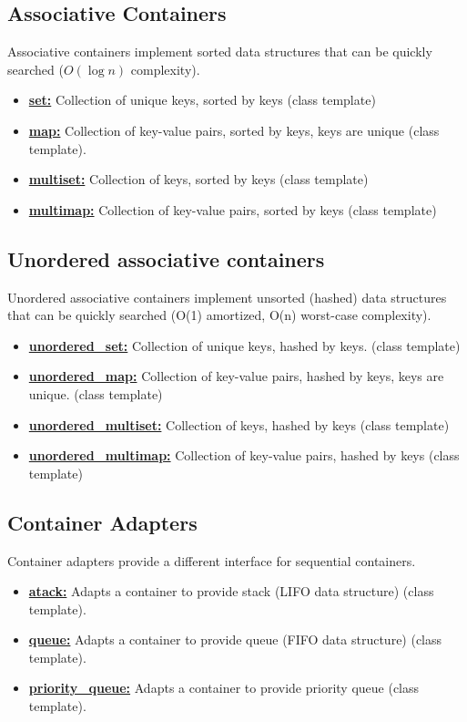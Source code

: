 \subsection{Associative Containers}
Associative containers implement sorted data structures that can be quickly searched ($O(\log{n})$ complexity). 
\begin{itemize}
	\item \textbf{\underline{set:}} Collection of unique keys, sorted by keys (class template)
	\item \textbf{\underline{map:}} Collection of key-value pairs, sorted by keys, keys are unique (class template).
	\item \textbf{\underline{multiset:}} Collection of keys, sorted by keys (class template)
	\item \textbf{\underline{multimap:}} Collection of key-value pairs, sorted by keys 
(class template)
\end{itemize}

\subsection{Unordered associative containers}
Unordered associative containers implement unsorted (hashed) data structures that can be quickly searched (O(1) amortized, O(n) worst-case complexity). 
\begin{itemize}
	\item \textbf{\underline{unordered\_set:}} Collection of unique keys, hashed by keys. (class template)
	\item \textbf{\underline{unordered\_map:}} Collection of key-value pairs, hashed by keys, keys are unique. (class template)
	\item \textbf{\underline{unordered\_multiset:}} Collection of keys, hashed by keys (class template)
	\item \textbf{\underline{unordered\_multimap:}} Collection of key-value pairs, hashed by keys (class template)
\end{itemize}

\subsection{Container Adapters}
Container adapters provide a different interface for sequential containers.
\begin{itemize}
	\item \textbf{\underline{atack:}} Adapts a container to provide stack (LIFO data structure) (class template).
	\item \textbf{\underline{queue:}} Adapts a container to provide queue (FIFO data structure) (class template).
	\item \textbf{\underline{priority\_queue:}} Adapts a container to provide priority queue (class template). 
\end{itemize}

